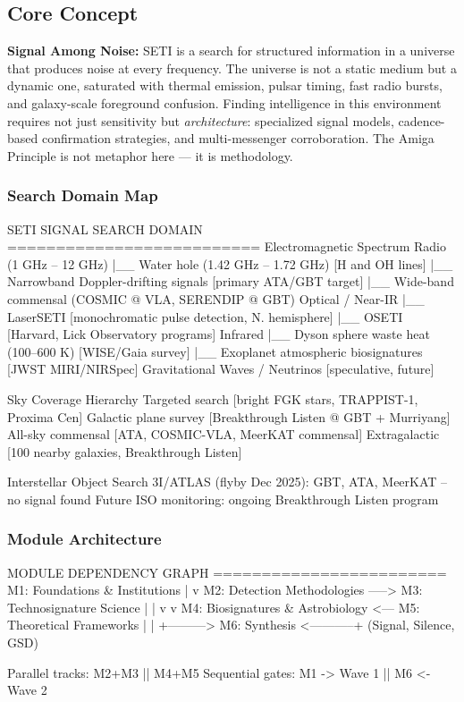 \documentclass[11pt,letterpaper]{article}
\begin{document}
\subsection{Core Concept}

\textbf{Signal Among Noise:} SETI is a search for structured information in a universe that produces noise at every frequency. The universe is not a static medium but a dynamic one, saturated with thermal emission, pulsar timing, fast radio bursts, and galaxy-scale foreground confusion. Finding intelligence in this environment requires not just sensitivity but \textit{architecture}: specialized signal models, cadence-based confirmation strategies, and multi-messenger corroboration. The Amiga Principle is not metaphor here --- it is methodology.

\subsubsection{Search Domain Map}

\begin{asciibox}
SETI SIGNAL SEARCH DOMAIN
==========================
Electromagnetic Spectrum
  Radio (1 GHz -- 12 GHz)
    |__ Water hole (1.42 GHz -- 1.72 GHz) [H and OH lines]
    |__ Narrowband Doppler-drifting signals [primary ATA/GBT target]
    |__ Wide-band commensal (COSMIC @ VLA, SERENDIP @ GBT)
  Optical / Near-IR
    |__ LaserSETI [monochromatic pulse detection, N. hemisphere]
    |__ OSETI [Harvard, Lick Observatory programs]
  Infrared
    |__ Dyson sphere waste heat (100--600 K) [WISE/Gaia survey]
    |__ Exoplanet atmospheric biosignatures [JWST MIRI/NIRSpec]
  Gravitational Waves / Neutrinos [speculative, future]

Sky Coverage Hierarchy
  Targeted search [bright FGK stars, TRAPPIST-1, Proxima Cen]
  Galactic plane survey [Breakthrough Listen @ GBT + Murriyang]
  All-sky commensal [ATA, COSMIC-VLA, MeerKAT commensal]
  Extragalactic [100 nearby galaxies, Breakthrough Listen]

Interstellar Object Search
  3I/ATLAS (flyby Dec 2025): GBT, ATA, MeerKAT -- no signal found
  Future ISO monitoring: ongoing Breakthrough Listen program
\end{asciibox}

\subsubsection{Module Architecture}

\begin{asciibox}
MODULE DEPENDENCY GRAPH
========================
  M1: Foundations & Institutions
        |
        v
  M2: Detection Methodologies -----> M3: Technosignature Science
        |                                     |
        v                                     v
  M4: Biosignatures & Astrobiology <--- M5: Theoretical Frameworks
        |                                     |
        +---------> M6: Synthesis <-----------+
                  (Signal, Silence, GSD)

Parallel tracks: M2+M3 || M4+M5
Sequential gates: M1 -> Wave 1 || M6 <- Wave 2
\end{asciibox}
\end{document}
